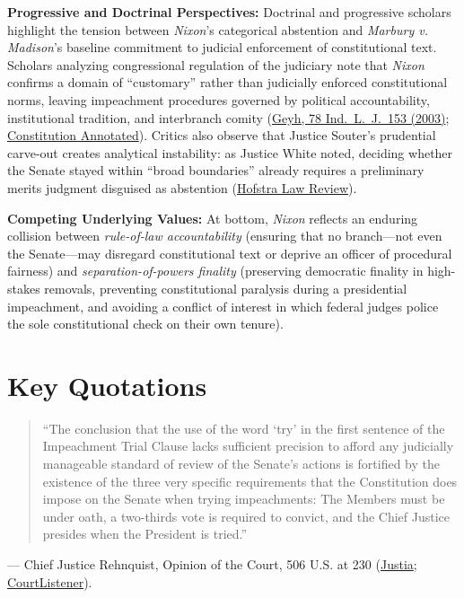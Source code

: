 \documentclass[12pt]{article}
\begin{document}
\textbf{Progressive and Doctrinal Perspectives:} Doctrinal and progressive scholars highlight the tension between \textit{Nixon}'s categorical abstention and \textit{Marbury v. Madison}'s baseline commitment to judicial enforcement of constitutional text. Scholars analyzing congressional regulation of the judiciary note that \textit{Nixon} confirms a domain of ``customary'' rather than judicially enforced constitutional norms, leaving impeachment procedures governed by political accountability, institutional tradition, and interbranch comity (\href{https://ilj.law.indiana.edu/articles/78/78_1_Geyh.pdf}{Geyh, 78 Ind.\ L.\ J.\ 153 (2003)}; \href{https://constitution.congress.gov/browse/essay/artII-S4-3/ALDE_00000698/}{Constitution Annotated}). Critics also observe that Justice Souter's prudential carve-out creates analytical instability: as Justice White noted, deciding whether the Senate stayed within ``broad boundaries'' already requires a preliminary merits judgment disguised as abstention (\href{https://scholarlycommons.law.hofstra.edu/cgi/viewcontent.cgi?article=2077&context=hlr}{Hofstra Law Review}).

\textbf{Competing Underlying Values:} At bottom, \textit{Nixon} reflects an enduring collision between \textit{rule-of-law accountability} (ensuring that no branch---not even the Senate---may disregard constitutional text or deprive an officer of procedural fairness) and \textit{separation-of-powers finality} (preserving democratic finality in high-stakes removals, preventing constitutional paralysis during a presidential impeachment, and avoiding a conflict of interest in which federal judges police the sole constitutional check on their own tenure).

\section{Key Quotations}

\begin{quote}
``The conclusion that the use of the word `try' in the first sentence of the Impeachment Trial Clause lacks sufficient precision to afford any judicially manageable standard of review of the Senate's actions is fortified by the existence of the three very specific requirements that the Constitution does impose on the Senate when trying impeachments: The Members must be under oath, a two-thirds vote is required to convict, and the Chief Justice presides when the President is tried.''
\end{quote}
\noindent--- Chief Justice Rehnquist, Opinion of the Court, 506 U.S. at 230 (\href{https://supreme.justia.com/cases/federal/us/506/224/}{Justia}; \href{https://www.courtlistener.com/opinion/112803/nixon-v-united-states/}{CourtListener}).
\end{document}
